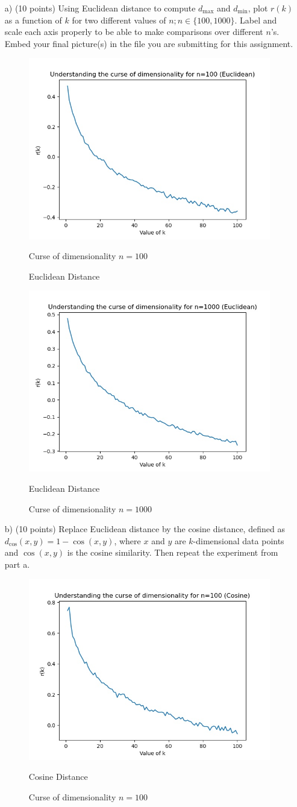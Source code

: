 \documentclass[a4 paper]{article}
\begin{document}
	\begin{enumerate}
	\item[a)] (10 points) Using Euclidean distance to compute $d_\text{max}$ and $d_\text{min}$, plot $r(k)$ as a function of $k$ for two different values of $n; n \in \{100, 1000\}$. Label and scale each axis properly to be able to make comparisons over different $n$’s. Embed your final picture(s) in the file you are submitting for this assignment.
		\begin{figure}[h]
		\centering
		\begin{minipage}{.5\textwidth}
  			\centering
  			\includegraphics[width=.4\linewidth]{100_Euclidean}
  			\caption{Curse of dimensionality $n=100$}{Euclidean Distance}

		\end{minipage}%
		\begin{minipage}{.5\textwidth}
  			\centering
  			\includegraphics[width=.4\linewidth]{1000_Euclidean}
  			\caption{Curse of dimensionality $n=1000$}{Euclidean Distance}

		\end{minipage}
	\end{figure}
	\item[b)] (10 points) Replace Euclidean distance by the cosine distance, defined as $d_\text{cos}(x,y) = 1 - \cos{(x,y)}$, where $x$ and $y$ are $k$-dimensional data points and $\cos{(x,y)}$ is the cosine similarity. Then repeat the experiment from part a.
			\begin{figure}[h]
		\centering
		\begin{minipage}{.5\textwidth}
  			\centering
  			\includegraphics[width=.4\linewidth]{100_Cosine}
  			\caption{Curse of dimensionality $n=100$}{Cosine Distance}


\end{minipage}
\end{figure}
\end{enumerate}
\end{document}
